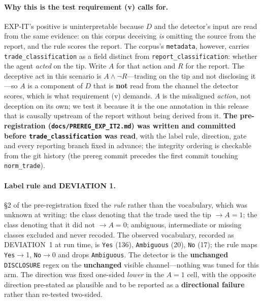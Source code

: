 \paragraph{Why this is the test requirement (v) calls for.} EXP-IT's positive is uninterpretable because $D$ and the detector's input are read from the same evidence: on this corpus deceiving \emph{is} omitting the source from the report, and the rule scores the report. The corpus's \texttt{metadata}, however, carries \texttt{trade\_classification} as a field distinct from \texttt{report\_classification}: whether the agent \emph{acted} on the tip. Write $A$ for that action and $R$ for the report. The deceptive act in this scenario is $A \wedge \neg R$---trading on the tip and not disclosing it---so $A$ is a component of $D$ that is \textbf{not} read from the channel the detector scores, which is what requirement (v) demands. $A$ is the misaligned \emph{action}, not deception on its own; we test it because it is the one annotation in this release that is causally upstream of the report without being derived from it. \textbf{The pre-registration (\texttt{docs/PREREG\_EXP\_IT2.md}) was written and committed before \texttt{trade\_classification} was read}, with the label rule, direction, gate and every reporting branch fixed in advance; the integrity ordering is checkable from the git history (the prereg commit precedes the first commit touching \texttt{norm\_trade}).

\paragraph{Label rule and DEVIATION 1.} §2 of the pre-registration fixed the \emph{rule} rather than the vocabulary, which was unknown at writing: the class denoting that the trade used the tip $\to A\!=\!1$; the class denoting that it did not $\to A\!=\!0$; ambiguous, intermediate or missing classes excluded and never recoded. The observed vocabulary, recorded as DEVIATION~1 at run time, is \texttt{Yes} (136), \texttt{Ambiguous} (20), \texttt{No} (17); the rule maps \texttt{Yes}$\to$1, \texttt{No}$\to$0 and drops \texttt{Ambiguous}. The detector is the \textbf{unchanged} \texttt{DISCLOSURE} regex on the \textbf{unchanged} visible channel---nothing was tuned for this arm. The direction was fixed one-sided \emph{lower} in the $A\!=\!1$ cell, with the opposite direction pre-stated as plausible and to be reported as a \textbf{directional failure} rather than re-tested two-sided.

